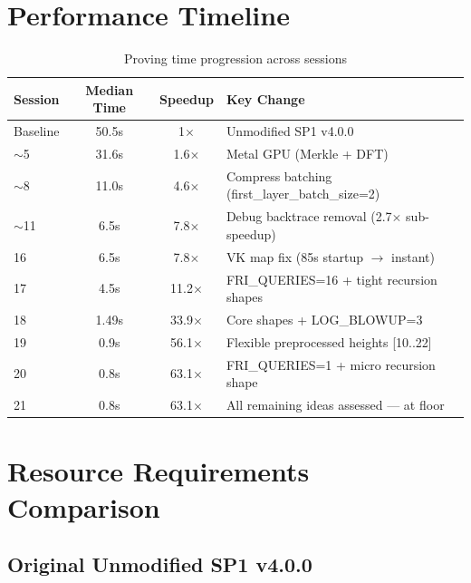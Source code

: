 \documentclass[11pt,a4paper]{article}
\begin{document}
\section{Performance Timeline}

\begin{table}[h]
\centering
\begin{tabular}{@{}lccl@{}}
\toprule
\textbf{Session} & \textbf{Median Time} & \textbf{Speedup} & \textbf{Key Change} \\
\midrule
Baseline & 50.5s & 1$\times$ & Unmodified SP1 v4.0.0 \\
$\sim$5 & 31.6s & 1.6$\times$ & Metal GPU (Merkle + DFT) \\
$\sim$8 & 11.0s & 4.6$\times$ & Compress batching (first\_layer\_batch\_size=2) \\
$\sim$11 & 6.5s & 7.8$\times$ & Debug backtrace removal (2.7$\times$ sub-speedup) \\
16 & 6.5s & 7.8$\times$ & VK map fix (85s startup $\rightarrow$ instant) \\
17 & 4.5s & 11.2$\times$ & FRI\_QUERIES=16 + tight recursion shapes \\
18 & 1.49s & 33.9$\times$ & Core shapes + LOG\_BLOWUP=3 \\
19 & 0.9s & 56.1$\times$ & Flexible preprocessed heights {[10..22]} \\
20 & 0.8s & 63.1$\times$ & FRI\_QUERIES=1 + micro recursion shape \\
21 & 0.8s & 63.1$\times$ & All remaining ideas assessed --- at floor \\
\bottomrule
\end{tabular}
\caption{Proving time progression across sessions}
\end{table}

\section{Resource Requirements Comparison}

\subsection{Original Unmodified SP1 v4.0.0}
\end{document}
